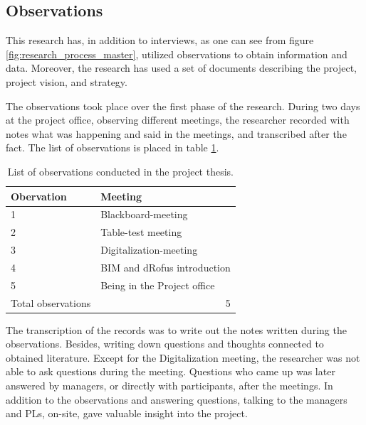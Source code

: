 \subsection*{Observations}
This research has, in addition to interviews, as one can see from figure \ref{fig:research_process_master}, utilized observations to obtain information and data. Moreover, the research has used a set of documents describing the project, project vision, and strategy. 

The observations took place over the first phase of the research. During two days at the project office, observing different meetings, the researcher recorded with notes what was happening and said in the meetings, and transcribed after the fact. The list of observations is placed in table \ref{tab:observations}. 

\begin{table}
    \begin{center}
        \begin{tabular}{p{}p{}}
        \toprule
        \textbf{Obervation} & \textbf{Meeting}              \\ \midrule
        1                   & Blackboard-meeting            \\
        2                   & Table-test meeting            \\
        3                   & Digitalization-meeting        \\
        4                   & BIM and dRofus introduction   \\
        5                   & Being in the Project office   \\
        Total observations  & \multicolumn{1}{r}{5}  \\ \bottomrule
        \end{tabular}
        \caption{List of observations conducted in the project thesis.}
        \label{tab:observations}
    \end{center}
\end{table}

The transcription of the records was to write out the notes written during the observations. Besides, writing down questions and thoughts connected to obtained literature. Except for the Digitalization meeting, the researcher was not able to ask questions during the meeting. Questions who came up was later answered by managers, or directly with participants, after the meetings. In addition to the observations and answering questions, talking to the managers and PLs, on-site, gave valuable insight into the project.

